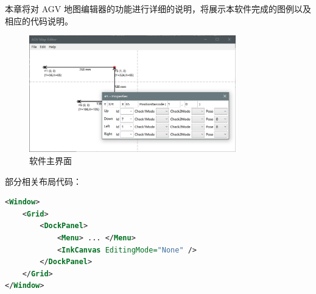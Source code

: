 
本章将对 AGV 地图编辑器的功能进行详细的说明，将展示本软件完成的图例以及相应的代码说明。

\begin{figure}[H]
  \centering
  \includegraphics[width=0.8\textwidth]{assets/mainview.png}
  \caption{软件主界面}
  \label{fig:mainview}
\end{figure}

部分相关布局代码：

\begin{lstlisting}[language=XML]
<Window>
    <Grid>
        <DockPanel>
            <Menu> ... </Menu>
            <InkCanvas EditingMode="None" />
        </DockPanel>
    </Grid>
</Window>
\end{lstlisting}

